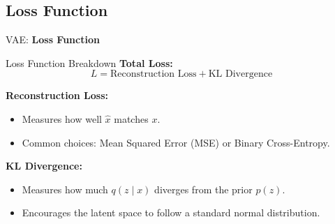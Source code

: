 \subsection{Loss Function}
\begin{frame}{}
	\LARGE VAE: \textbf{Loss Function}
\end{frame}

\begin{frame}[allowframebreaks]{Loss Function Breakdown}
\textbf{Total Loss:}
\[
L = \text{Reconstruction Loss} + \text{KL Divergence}
\]

\textbf{Reconstruction Loss:}
\begin{itemize}
    \item Measures how well $\hat{x}$ matches $x$.
    \item Common choices: Mean Squared Error (MSE) or Binary Cross-Entropy.
\end{itemize}

\textbf{KL Divergence:}
\begin{itemize}
    \item Measures how much $q(z \mid x)$ diverges from the prior $p(z)$.
    \item Encourages the latent space to follow a standard normal distribution.
\end{itemize}
\end{frame}